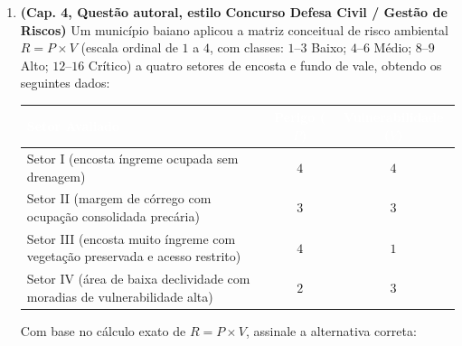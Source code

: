 \begin{enumerate}[leftmargin=1.8em, itemsep=6pt]
  \item \textbf{(Cap. 4, Questão autoral, estilo Concurso Defesa Civil / Gestão de Riscos)} Um município baiano aplicou a matriz conceitual de risco ambiental $R = P \times V$ (escala ordinal de $1$ a $4$, com classes: $1$--$3$ Baixo; $4$--$6$ Médio; $8$--$9$ Alto; $12$--$16$ Crítico) a quatro setores de encosta e fundo de vale, obtendo os seguintes dados:
  \begin{center}
  \renewcommand{\arraystretch}{1.15}
  \small
  \begin{tabular}{@{}lcc@{}}
    \toprule
    \rowcolor{uefsNavy}
    \textcolor{white}{\bfseries Setor Avaliado} & \textcolor{white}{\bfseries Perigo ($P$)} & \textcolor{white}{\bfseries Vulnerabilidade ($V$)} \\
    \midrule
    Setor I (encosta íngreme ocupada sem drenagem) & $4$ & $4$ \\
    \rowcolor{bgGray}
    Setor II (margem de córrego com ocupação consolidada precária) & $3$ & $3$ \\
    Setor III (encosta muito íngreme com vegetação preservada e acesso restrito) & $4$ & $1$ \\
    \rowcolor{bgGray}
    Setor IV (área de baixa declividade com moradias de vulnerabilidade alta) & $2$ & $3$ \\
    \bottomrule
  \end{tabular}
  \end{center}
  Com base no cálculo exato de $R = P \times V$, assinale a alternativa correta:
  \espacoResolucao[1.5cm]


\end{enumerate}
